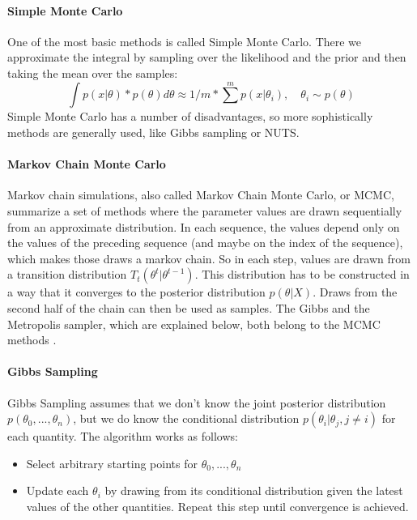 \documentclass{article}
\begin{document}
\paragraph{Simple Monte Carlo}
One of the most basic methods is called Simple Monte Carlo. There we approximate the integral by sampling over the likelihood and the prior and then taking the mean over the samples:
\begin{equation}
\int p(x|\theta) * p(\theta) d \theta \approx 1/m * \sum^m p(x|\theta_i),\quad \theta_i \sim p(\theta)
\end{equation}
Simple Monte Carlo has a number of disadvantages, so more sophistically methods are generally used, like Gibbs sampling or NUTS.
\paragraph{Markov Chain Monte Carlo}
Markov chain simulations, also called Markov Chain Monte Carlo, or MCMC, summarize a set of methods where the parameter values are drawn sequentially from an approximate distribution. In each sequence, the values depend only on the values of the preceding sequence (and maybe on the index of the sequence), which makes those draws a markov chain. So in each step, values are drawn from a transition distribution $T_t(\theta^t|\theta^{t-1})$. This distribution has to be constructed in a way that it converges to the posterior distribution $p(\theta|X)$. Draws from the second half of the chain can then be used as samples. The Gibbs and the Metropolis sampler, which are explained below, both belong to the MCMC methods \cite{1439840954}.
\paragraph{Gibbs Sampling}
Gibbs Sampling assumes that we don't know the joint posterior distribution $p(\theta_0,...,\theta_n)$, but we do know the conditional distribution $p(\theta_i | \theta_j, j \neq i)$ for each quantity.
The algorithm works as follows:
\begin{itemize}
	\item Select arbitrary starting points for $\theta_0,...,\theta_n$
	\item Update each $\theta_i$ by drawing from its conditional distribution given the latest values of the other quantities. Repeat this step until convergence is achieved.
\end{itemize}
\cite{Martz1994}
\end{document}
